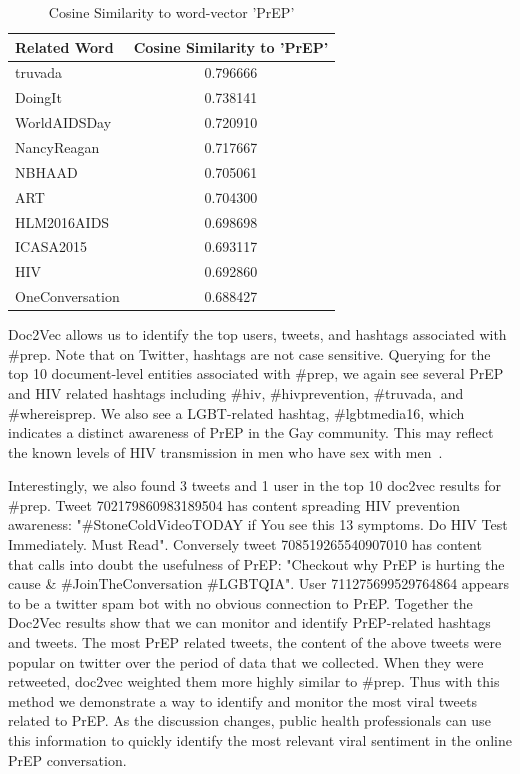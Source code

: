 \documentclass{sig-alternate-05-2015}
\begin{document}
\begin{table}
\centering
\caption{Cosine Similarity to word-vector 'PrEP'}
\begin{tabular}{|l|c|} \hline
Related Word & Cosine Similarity to 'PrEP'\\ \hline
truvada & 0.796666\\ \hline
DoingIt & 0.738141\\ \hline
WorldAIDSDay & 0.720910\\ \hline
NancyReagan & 0.717667\\ \hline
NBHAAD & 0.705061\\ \hline
ART & 0.704300\\ \hline
HLM2016AIDS & 0.698698\\ \hline
ICASA2015 & 0.693117\\ \hline
HIV & 0.692860\\ \hline
OneConversation & 0.688427\\ \hline
\hline\end{tabular}
\end{table}

Doc2Vec allows us to identify the top users, tweets, and hashtags associated with \#prep. Note that on Twitter, hashtags are not case sensitive. Querying for the top 10 document-level entities associated with \#prep, we again see several PrEP and HIV related hashtags including \#hiv, \#hivprevention, \#truvada, and \#whereisprep. We also see a LGBT-related hashtag, \#lgbtmedia16, which indicates a distinct awareness of PrEP in the Gay community. This may reflect the known levels of HIV transmission in men who have sex with men~\cite{centers2014hiv}.

Interestingly, we also found 3 tweets and 1 user in the top 10 doc2vec results for \#prep. Tweet 702179860983189504 has content spreading HIV prevention awareness: "\#StoneColdVideoTODAY if You see this 13 symptoms. Do HIV Test Immediately. Must Read". Conversely tweet 708519265540907010 has content that calls into doubt the usefulness of PrEP: "Checkout why PrEP is hurting the cause \& \#JoinTheConversation \#LGBTQIA". User 711275699529764864 appears to be a twitter spam bot with no obvious connection to PrEP. Together the Doc2Vec results show that we can monitor and identify PrEP-related hashtags and tweets. The most PrEP related tweets, the content of the above tweets were popular on twitter over the period of data that we collected. When they were retweeted, doc2vec weighted them more highly similar to \#prep. Thus with this method we demonstrate a way to identify and monitor the most viral tweets related to PrEP. As the discussion changes, public health professionals can use this information to quickly identify the most relevant viral sentiment in the online PrEP conversation.
\end{document}
